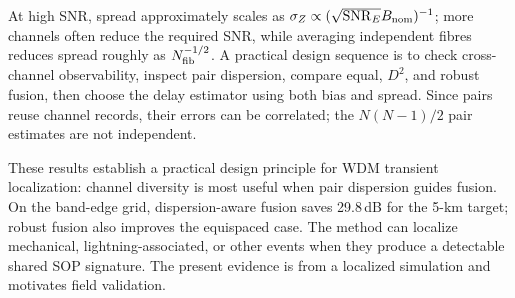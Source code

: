 \documentclass[10pt]{article}
\newcommand{\SNR}{\mathrm{SNR}}
\begin{document}
At high SNR, spread approximately scales as $\sigma_Z\propto(\sqrt{\SNR_E}B_{\rm nom})^{-1}$; more channels often reduce the required SNR, while averaging independent fibres reduces spread roughly as $N_{\rm fib}^{-1/2}$. A practical design sequence is to check cross-channel observability, inspect pair dispersion, compare equal, $D^2$, and robust fusion, then choose the delay estimator using both bias and spread. Since pairs reuse channel records, their errors can be correlated; the $N(N-1)/2$ pair estimates are not independent.

These results establish a practical design principle for WDM transient localization: channel diversity is most useful when pair dispersion guides fusion. On the band-edge grid, dispersion-aware fusion saves 29.8\,dB for the 5-km target; robust fusion also improves the equispaced case. The method can localize mechanical, lightning-associated, or other events when they produce a detectable shared SOP signature. The present evidence is from a localized simulation and motivates field validation.
\end{document}
